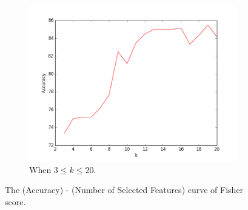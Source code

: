 \documentclass{article} %
\begin{document}
\begin{enumerate}
\begin{figure}[H]
\begin{subfigure}{.5\textwidth}
          \includegraphics[width=\linewidth]{figure_4.png}
          \caption{When $3\leq k\leq 20$.}
          \label{fig4}
          \end{subfigure}
          \caption{The (Accuracy) - (Number of Selected Features) curve of Fisher score.}
          \label{fig3-4}
          \end{figure}


\end{enumerate}
\end{document}
